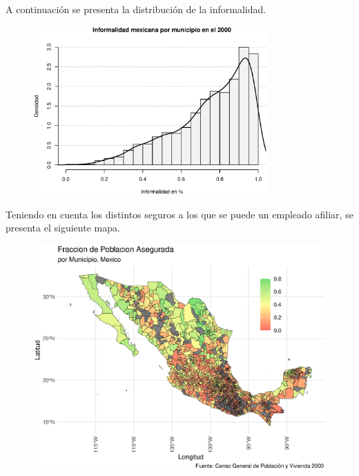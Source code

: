 \documentclass[9pt]{article}
\begin{document}
 A continuaci\'on se presenta la distribuci\'on de la informalidad.
 \begin{figure}[H]
     \centering
     \includegraphics[width=0.8\textwidth]{figs/histinf.eps}
 \end{figure}
 \newpage
 Teniendo en cuenta los distintos seguros a los que se puede un empleado afiliar, se presenta el siguiente mapa. 

\begin{figure}[H]
     \centering
     \includegraphics[width=\textwidth]{figs/insured.eps}
 \end{figure}
\end{document}
